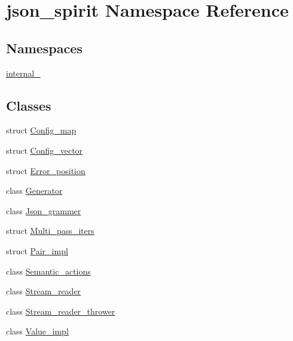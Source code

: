 \hypertarget{namespacejson__spirit}{}\section{json\+\_\+spirit Namespace Reference}
\label{namespacejson__spirit}
\subsection*{Namespaces}
\begin{DoxyCompactItemize}
\item 
 \hyperlink{namespacejson__spirit_1_1internal__}{internal\+\_\+}
\end{DoxyCompactItemize}
\subsection*{Classes}
\begin{DoxyCompactItemize}
\item 
struct \hyperlink{structjson__spirit_1_1_config__map}{Config\+\_\+map}
\item 
struct \hyperlink{structjson__spirit_1_1_config__vector}{Config\+\_\+vector}
\item 
struct \hyperlink{structjson__spirit_1_1_error__position}{Error\+\_\+position}
\item 
class \hyperlink{classjson__spirit_1_1_generator}{Generator}
\item 
class \hyperlink{classjson__spirit_1_1_json__grammer}{Json\+\_\+grammer}
\item 
struct \hyperlink{structjson__spirit_1_1_multi__pass__iters}{Multi\+\_\+pass\+\_\+iters}
\item 
struct \hyperlink{structjson__spirit_1_1_pair__impl}{Pair\+\_\+impl}
\item 
class \hyperlink{classjson__spirit_1_1_semantic__actions}{Semantic\+\_\+actions}
\item 
class \hyperlink{classjson__spirit_1_1_stream__reader}{Stream\+\_\+reader}
\item 
class \hyperlink{classjson__spirit_1_1_stream__reader__thrower}{Stream\+\_\+reader\+\_\+thrower}
\item 
class \hyperlink{classjson__spirit_1_1_value__impl}{Value\+\_\+impl}
\end{DoxyCompactItemize}
